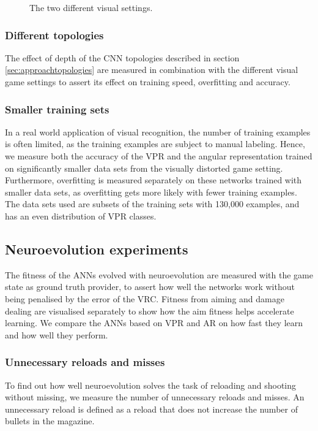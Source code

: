 \begin{figure}[H]
	\begin{scriptsize}
		
	\end{scriptsize}
	\caption{The two different visual settings.}
	\label{fig:light}
\end{figure}

\subsubsection{Different topologies}
The effect of depth of the CNN topologies described in section \ref{sec:approachtopologies} are measured in combination with the different visual game settings to assert its effect on training speed, overfitting and accuracy.

\subsubsection{Smaller training sets}
In a real world application of visual recognition, the number of training examples is often limited, as the training examples are subject to manual labeling. Hence, we measure both the accuracy of the VPR and the angular representation trained on significantly smaller data sets from the visually distorted game setting. Furthermore, overfitting is measured separately on these networks trained with smaller data sets, as overfitting gets more likely with fewer training examples. The data sets used are subsets of the training sets with 130,000 examples, and has an even distribution of VPR classes.

 
\subsection{Neuroevolution experiments}
The fitness of the ANNs evolved with neuroevolution are measured with the game state as ground truth provider, to assert how well the networks work without being penalised by the error of the VRC. Fitness from aiming and damage dealing are visualised separately to show how the aim fitness helps accelerate learning. We compare the ANNs based on VPR and AR on how fast they learn and how well they perform.

\subsubsection{Unnecessary reloads and misses}
To find out how well neuroevolution solves the task of reloading and shooting without missing, we measure the number of unnecessary reloads and misses. An unnecessary reload is defined as a reload that does not increase the number of bullets in the magazine.








